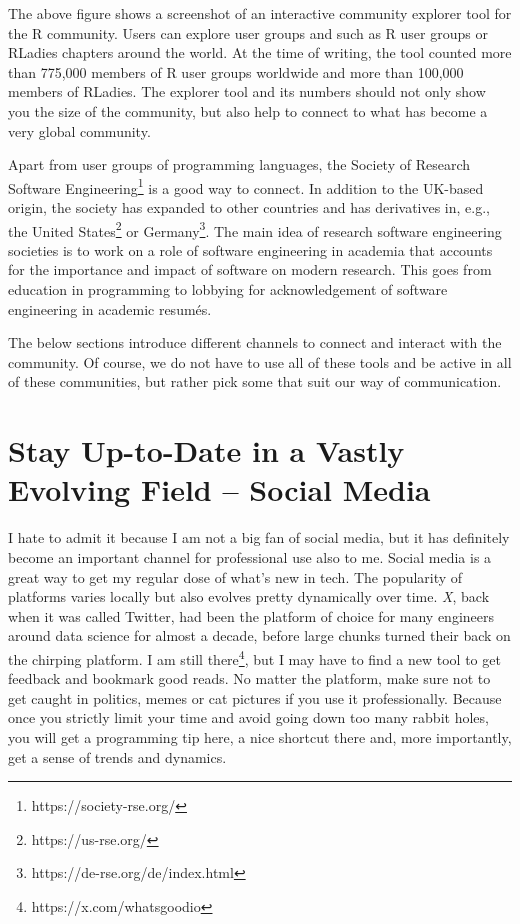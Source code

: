 \documentclass[
  12pt,
  letterpaper,
]{krantz}
\begin{document}
The above figure shows a screenshot of an interactive community explorer
tool for the R community. Users can explore user groups and such as R
user groups or RLadies chapters around the world. At the time of
writing, the tool counted more than 775,000 members of R user groups
worldwide and more than 100,000 members of RLadies. The explorer tool
and its numbers should not only show you the size of the community, but
also help to connect to what has become a very global community.

Apart from user groups of programming languages, the Society of Research
Software
Engineering\footnote{https://society-rse.org/}
is a good way to connect. In addition to the UK-based origin, the
society has expanded to other countries and has derivatives in, e.g.,
the United States\footnote{https://us-rse.org/} or Germany\footnote{https://de-rse.org/de/index.html}.
The main idea of research software engineering societies is to work on a
role of software engineering in academia that accounts for the
importance and impact of software on modern research. This goes from
education in programming to lobbying for acknowledgement of software
engineering in academic resumés.

The below sections introduce different channels to connect and interact
with the community. Of course, we do not have to use all of these tools
and be active in all of these communities, but rather pick some that
suit our way of communication.

\hypertarget{stay-up-to-date-in-a-vastly-evolving-field-social-media}{%
\section{Stay Up-to-Date in a Vastly Evolving Field -- Social
Media}\label{stay-up-to-date-in-a-vastly-evolving-field-social-media}}

I hate to admit it because I am not a big fan of social media, but it
has definitely become an important channel for professional use also to
me. Social media is a great way to get my regular dose of what's new in
tech. The popularity of platforms varies locally but also evolves pretty
dynamically over time. \emph{X}, back when it was called Twitter, had
been the platform of choice for many engineers around data science for
almost a decade, before large chunks turned their back on the chirping
platform. I am still there\footnote{https://x.com/whatsgoodio}, but I
may have to find a new tool to get feedback and bookmark good reads. No
matter the platform, make sure not to get caught in politics, memes or
cat pictures if you use it professionally. Because once you strictly
limit your time and avoid going down too many rabbit holes, you will get
a programming tip here, a nice shortcut there and, more importantly, get
a sense of trends and dynamics.
\end{document}
